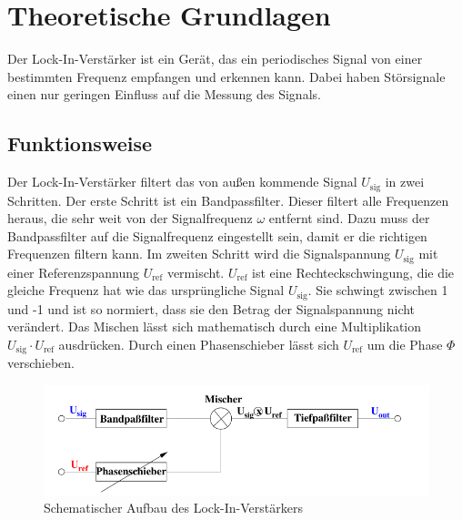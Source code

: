 \section{Theoretische Grundlagen}
Der Lock-In-Verstärker ist ein Gerät, das ein periodisches Signal von einer bestimmten Frequenz empfangen und erkennen kann.
Dabei haben Störsignale einen nur geringen Einfluss auf die Messung des Signals.
\subsection{Funktionsweise}
Der Lock-In-Verstärker filtert das von außen kommende Signal $U_\text{sig}$ in zwei Schritten.
Der erste Schritt ist ein Bandpassfilter.
Dieser filtert alle Frequenzen heraus, die sehr weit von der Signalfrequenz $\omega$ entfernt sind.
Dazu muss der Bandpassfilter auf die Signalfrequenz eingestellt sein, damit er die richtigen Frequenzen filtern kann.
Im zweiten Schritt wird die Signalspannung $U_\text{sig}$ mit einer Referenzspannung $U_\text{ref}$ vermischt.
$U_\text{ref}$ ist eine Rechteckschwingung, die die gleiche Frequenz hat wie das ursprüngliche Signal $U_\text{sig}$.
Sie schwingt zwischen 1 und -1 und ist so normiert, dass sie den Betrag der Signalspannung nicht verändert.
Das Mischen lässt sich mathematisch durch eine Multiplikation $U_\text{sig} \cdot U_\text{ref}$ ausdrücken.
Durch einen Phasenschieber lässt sich $U_\text{ref}$ um die Phase $\Phi$ verschieben.
\begin{figure}
    \includegraphics[width=\textwidth]{Abbildungen/Grundlegende_idee.png}
    \caption{Schematischer Aufbau des Lock-In-Verstärkers \cite[][]{man:v303}}
    \label{fig:grundlegende_Idee}
\end{figure}

